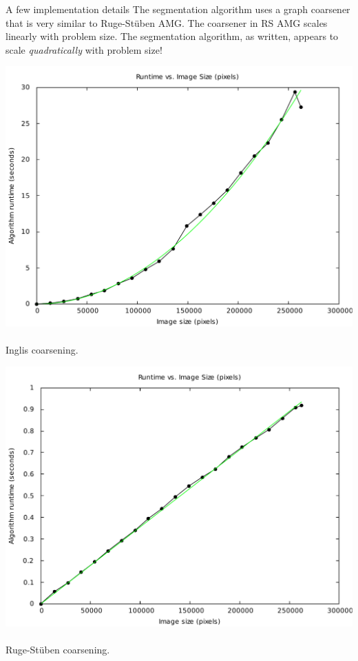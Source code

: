 \documentclass[8pt]{beamer}
\begin{document}
\begin{frame}{A few implementation details}
   The segmentation algorithm uses a graph coarsener that is very similar to Ruge-St\"uben AMG.  The coarsener in RS AMG scales linearly with problem size.  The segmentation algorithm, as written, appears to scale \emph{quadratically} with problem size!\\[0.5cm]

   \begin{minipage}{0.45\textwidth}
      \includegraphics[width=\textwidth]{runtime_scaling_segAMG_spiral_512_james.pdf}
      ~\\Inglis coarsening.
   \end{minipage}
   \hspace{0.05\textwidth}
   \begin{minipage}{0.45\textwidth}
      \includegraphics[width=\textwidth]{runtime_scaling_RSAMG_spiral_512_james.pdf}
      ~\\Ruge-St\"uben coarsening.
   \end{minipage}

\end{frame}
\end{document}
